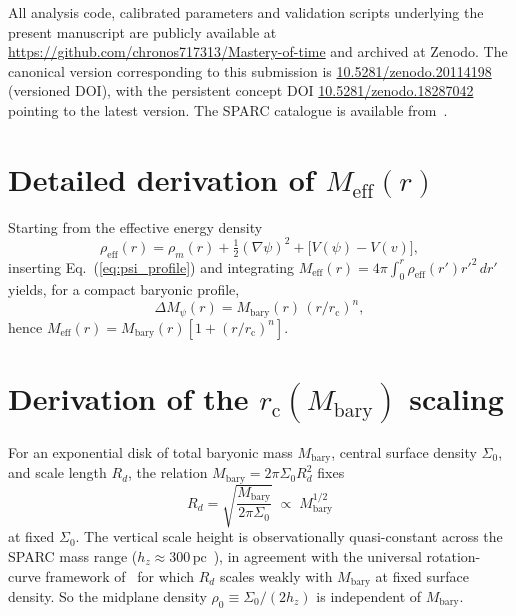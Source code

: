 \documentclass[%
    aps,
    prd,
    reprint,
    superscriptaddress,
    nofootinbib,
    floatfix,
    amsmath,amssymb,
]{revtex4-2}
\newcommand{\Meff}{M_{\mathrm{eff}}}
\newcommand{\Mbary}{M_{\mathrm{bary}}}
\newcommand{\rc}{r_{\mathrm{c}}}
\begin{document}
All analysis code, calibrated parameters and validation scripts
underlying the present manuscript are publicly available at
\url{https://github.com/chronos717313/Mastery-of-time} and archived
at Zenodo. The canonical version corresponding to this submission
is \href{https://doi.org/10.5281/zenodo.20114198}{10.5281/zenodo.20114198}
(versioned DOI), with the persistent concept DOI
\href{https://doi.org/10.5281/zenodo.18287042}{10.5281/zenodo.18287042}
pointing to the latest version. The SPARC catalogue is available
from~\cite{Lelli2016}.

\appendix

\section{Detailed derivation of \texorpdfstring{$\Meff(r)$}{Meff}}
\label{app:meff_derivation}

Starting from the effective energy density
\begin{equation}
\rho_{\mathrm{eff}}(r) = \rho_{m}(r) + \tfrac{1}{2}(\nabla\psi)^{2}
                         + \bigl[V(\psi)-V(v)\bigr],
\end{equation}
inserting Eq.~(\ref{eq:psi_profile}) and integrating
$\Meff(r) = 4\pi\!\int_{0}^{r}\rho_{\mathrm{eff}}(r')r'^{2}\,dr'$
yields, for a compact baryonic profile,
\begin{equation}
\Delta M_{\psi}(r) = \Mbary(r)\,(r/\rc)^{n},
\end{equation}
hence $\Meff(r)=\Mbary(r)[1+(r/\rc)^{n}]$.

\section{Derivation of the $\rc(\Mbary)$ scaling}
\label{app:rc_derivation}

For an exponential disk of total baryonic mass $\Mbary$, central
surface density $\Sigma_{0}$, and scale length $R_{d}$, the
relation $\Mbary = 2\pi\Sigma_{0} R_{d}^{2}$ fixes
\begin{equation}
R_{d} = \sqrt{\frac{\Mbary}{2\pi\Sigma_{0}}} \;\propto\; \Mbary^{1/2}
\end{equation}
at fixed $\Sigma_{0}$. The vertical scale height is observationally
quasi-constant across the SPARC mass range
($h_{z}\!\approx\!300\,\mathrm{pc}$~\cite{Yoachim2006,Bizyaev2014}),
in agreement with the universal rotation-curve framework
of~\cite{Persic1996} for which $R_{d}$ scales weakly with
$\Mbary$ at fixed surface density. So the midplane density $\rho_{0}\equiv\Sigma_{0}/(2 h_{z})$ is
independent of $\Mbary$.
\end{document}
